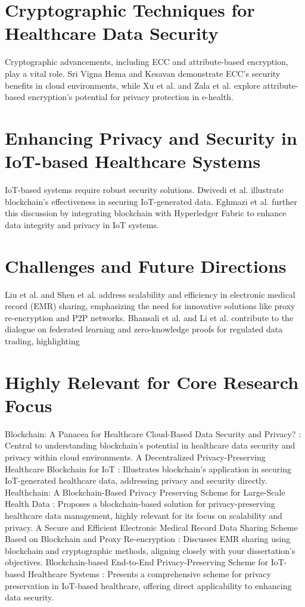 \documentclass[cic,tc,english]{iiufrgs}
\begin{document}
\section{Cryptographic Techniques for Healthcare Data Security}
Cryptographic advancements, including ECC and attribute-based encryption, play a vital role. Sri Vigna Hema and Kesavan \cite{sri2019} demonstrate ECC's security benefits in cloud environments, while Xu et al. \cite{XuJie2019} and Zala et al. \cite{Zala2024} explore attribute-based encryption's potential for privacy protection in e-health.

\section{Enhancing Privacy and Security in IoT-based Healthcare Systems}
IoT-based systems require robust security solutions. Dwivedi et al. \cite{Dwivedi2019} illustrate blockchain's effectiveness in securing IoT-generated data. Eghmazi et al. \cite{Eghmazi2024} further this discussion by integrating blockchain with Hyperledger Fabric to enhance data integrity and privacy in IoT systems.

\section{Challenges and Future Directions}
Liu et al. \cite{Liu2024} and Shen et al. \cite{Shen2019} address scalability and efficiency in electronic medical record (EMR) sharing, emphasizing the need for innovative solutions like proxy re-encryption and P2P networks. Bhansali et al. \cite{Bhansali2022} and Li et al. \cite{Li2024} contribute to the dialogue on federated learning and zero-knowledge proofs for regulated data trading, highlighting 

\section{Highly Relevant for Core Research Focus}

    Blockchain: A Panacea for Healthcare Cloud-Based Data Security and Privacy? \cite{Esposito2018}: Central to understanding blockchain's potential in healthcare data security and privacy within cloud environments.
    A Decentralized Privacy-Preserving Healthcare Blockchain for IoT \cite{Dwivedi2019}: Illustrates blockchain's application in securing IoT-generated healthcare data, addressing privacy and security directly.
    Healthchain: A Blockchain-Based Privacy Preserving Scheme for Large-Scale Health Data \cite{XuJie2019}: Proposes a blockchain-based solution for privacy-preserving healthcare data management, highly relevant for its focus on scalability and privacy.
    A Secure and Efficient Electronic Medical Record Data Sharing Scheme Based on Blockchain and Proxy Re-encryption \cite{Liu2024}: Discusses EMR sharing using blockchain and cryptographic methods, aligning closely with your dissertation’s objectives.
    Blockchain-based End-to-End Privacy-Preserving Scheme for IoT-based Healthcare Systems \cite{maryam2024}: Presents a comprehensive scheme for privacy preservation in IoT-based healthcare, offering direct applicability to enhancing data security.
\end{document}
